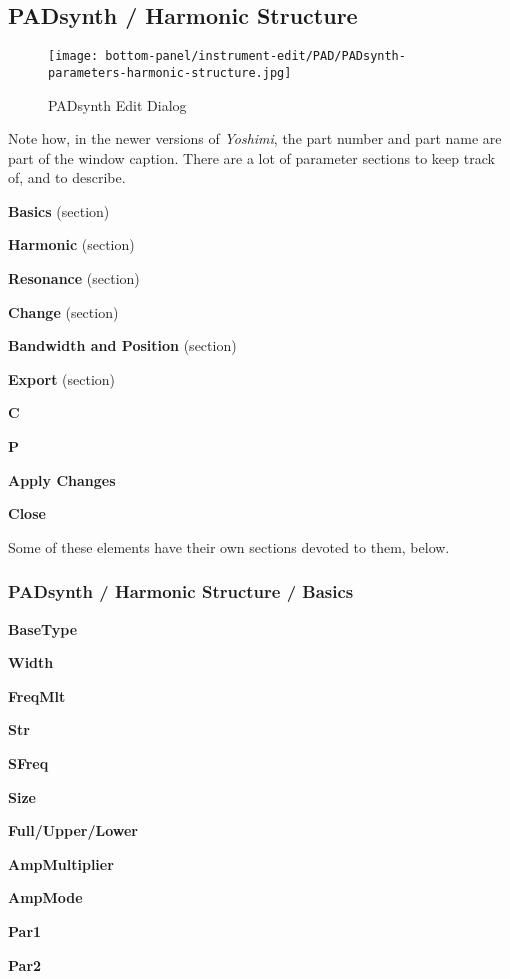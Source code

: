 \subsection{PADsynth / Harmonic Structure}
\label{subsec:padsynth_harmonic_structure}

\begin{figure}[H]
   \centering 
   \texttt{[image: bottom-panel/instrument-edit/PAD/PADsynth-parameters-harmonic-structure.jpg]}
   \caption{PADsynth Edit Dialog}
   \label{fig:padsynth_edit_dialog}
\end{figure}

   Note how, in the newer versions of \textsl{Yoshimi}, the
   part number and part name are part of the window caption.
   There are a lot of parameter sections to keep track of, and to describe.

   \begin{enumber}
      \item \textbf{Basics} (section)
      \item \textbf{Harmonic} (section)
      \item \textbf{Resonance} (section)
      \item \textbf{Change} (section)
      \item \textbf{Bandwidth and Position} (section)
      \item \textbf{Export} (section)
      \item \textbf{C}
      \item \textbf{P}
      \item \textbf{Apply Changes}
      \item \textbf{Close}
   \end{enumber}

   Some of these elements have their own sections devoted to them, below.

\subsubsection{PADsynth / Harmonic Structure / Basics}
\label{subsubsec:padsynth_harmonic_structure_basics}

   \begin{enumber}
      \item \textbf{BaseType}
      \item \textbf{Width}
      \item \textbf{FreqMlt}
      \item \textbf{Str}
      \item \textbf{SFreq}
      \item \textbf{Size}
      \item \textbf{Full/Upper/Lower}
      \item \textbf{AmpMultiplier}
      \item \textbf{AmpMode}
      \item \textbf{Par1}
      \item \textbf{Par2}
   \end{enumber}

